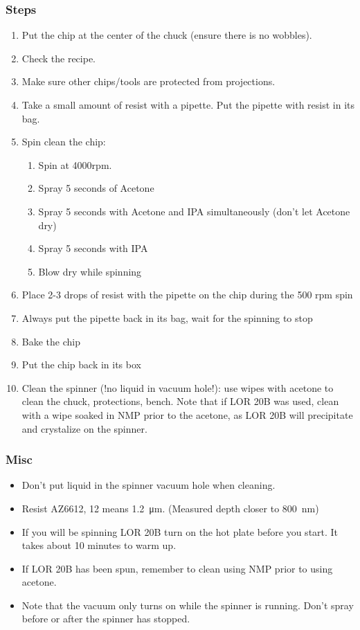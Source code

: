 \subsubsection{Steps}
\begin{enumerate}
\item Put the chip at the center of the chuck (ensure there is no wobbles).
\item Check the recipe.
\item Make sure other chips/tools are protected from projections.
\item Take a small amount of resist with a pipette. Put the pipette with resist in its bag.
\item Spin clean the chip:
\begin{enumerate}
\item Spin at 4000rpm.
\item Spray 5 seconds of Acetone
\item Spray 5 seconds with Acetone and IPA simultaneously (don't let Acetone dry)
\item Spray 5 seconds with IPA
\item Blow dry while spinning
\end{enumerate}
\item Place 2-3 drops of resist with the pipette on the chip during the 500 rpm spin
\item Always put the pipette back in its bag, wait for the spinning to stop
\item Bake the chip
\item Put the chip back in its box
\item Clean the spinner (!no liquid in vacuum hole!): use wipes with acetone to clean the chuck, protections, bench. Note that
      if LOR 20B was used, clean with a wipe soaked in NMP prior to the acetone, as LOR 20B will precipitate and crystalize on the spinner.
\end{enumerate}

\subsubsection{Misc}
\begin{itemize}
\item Don't put liquid in the spinner vacuum hole when cleaning.
\item Resist AZ6612, 12 means \SI{1.2}{\micro\meter}. (Measured depth closer to \SI{800}{\nano\meter})
\item If you will be spinning LOR 20B turn on the hot plate before you start. It takes about 10 minutes to warm up.
\item If LOR 20B has been spun, remember to clean using NMP prior to using acetone.
\item Note that the vacuum only turns on while the spinner is running. Don't spray before or after the spinner has stopped.
\end{itemize}

\newpage


